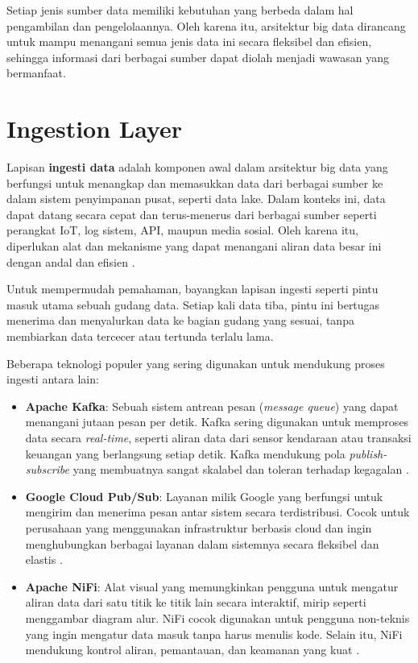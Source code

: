 Setiap jenis sumber data memiliki kebutuhan yang berbeda dalam hal pengambilan dan pengelolaannya. Oleh karena itu, arsitektur big data dirancang untuk mampu menangani semua jenis data ini secara fleksibel dan efisien, sehingga informasi dari berbagai sumber dapat diolah menjadi wawasan yang bermanfaat.


\section{Ingestion Layer}

Lapisan \textbf{ingesti data} adalah komponen awal dalam arsitektur big data yang berfungsi untuk menangkap dan memasukkan data dari berbagai sumber ke dalam sistem penyimpanan pusat, seperti data lake. Dalam konteks ini, data dapat datang secara cepat dan terus-menerus dari berbagai sumber seperti perangkat IoT, log sistem, API, maupun media sosial. Oleh karena itu, diperlukan alat dan mekanisme yang dapat menangani aliran data besar ini dengan andal dan efisien \cite{kreps2011kafka}.

Untuk mempermudah pemahaman, bayangkan lapisan ingesti seperti pintu masuk utama sebuah gudang data. Setiap kali data tiba, pintu ini bertugas menerima dan menyalurkan data ke bagian gudang yang sesuai, tanpa membiarkan data tercecer atau tertunda terlalu lama.

Beberapa teknologi populer yang sering digunakan untuk mendukung proses ingesti antara lain:

\begin{itemize}
	\item \textbf{Apache Kafka}: Sebuah sistem antrean pesan (\textit{message queue}) yang dapat menangani jutaan pesan per detik. Kafka sering digunakan untuk memproses data secara \textit{real-time}, seperti aliran data dari sensor kendaraan atau transaksi keuangan yang berlangsung setiap detik. Kafka mendukung pola \textit{publish-subscribe} yang membuatnya sangat skalabel dan toleran terhadap kegagalan \cite{kreps2011kafka}.
	
	\item \textbf{Google Cloud Pub/Sub}: Layanan milik Google yang berfungsi untuk mengirim dan menerima pesan antar sistem secara terdistribusi. Cocok untuk perusahaan yang menggunakan infrastruktur berbasis cloud dan ingin menghubungkan berbagai layanan dalam sistemnya secara fleksibel dan elastis \cite{googlepubsubdocs}.
	
	\item \textbf{Apache NiFi}: Alat visual yang memungkinkan pengguna untuk mengatur aliran data dari satu titik ke titik lain secara interaktif, mirip seperti menggambar diagram alur. NiFi cocok digunakan untuk pengguna non-teknis yang ingin mengatur data masuk tanpa harus menulis kode. Selain itu, NiFi mendukung kontrol aliran, pemantauan, dan keamanan yang kuat \cite{apachenifiuserguide}.
\end{itemize}

